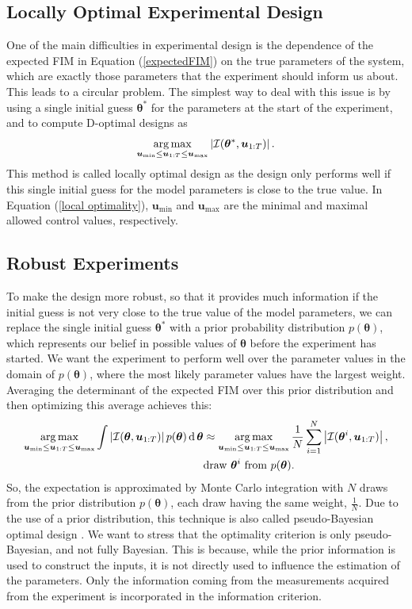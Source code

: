 \subsection{Locally Optimal Experimental Design}
One of the main difficulties in experimental design is the dependence of the expected FIM in Equation (\ref{expectedFIM}) on the true parameters of the system, which are exactly those parameters that the experiment should inform us about. This leads to a circular problem. The simplest way to deal with this issue is by using a single initial guess $\bm \theta^*$ for the parameters at the start of the experiment, and to compute D-optimal designs as
\begin{equation}
\operatorname*{arg\,max}_{\bm u_\text{min} \leq \bm u_{1:T} \leq \bm u_\text{max}}  \left | \mathcal{I}(\bm \theta^*,\bm u_{1:T}) \right|.
\label{local optimality}
\end{equation}
This method is called locally optimal design as the design only performs well if this single initial guess for the model parameters is close to the true value. In Equation (\ref{local optimality}), $\bm u_\text{min}$ and $\bm u_\text{max}$ are the minimal and maximal allowed control values, respectively.
\subsection{Robust Experiments}
To make the design more robust, so that it provides much information if the initial guess is not very close to the true value of the model parameters, we can replace the single initial guess $\bm \theta^*$ with a prior probability distribution $p(\bm \theta)$, which represents our belief in possible values of $\bm \theta$ before the experiment has started. We want the experiment to perform well over the parameter values in the domain of $p(\bm \theta)$, where the most likely parameter values have the largest weight. Averaging the determinant of the expected FIM over this prior distribution and then optimizing this average achieves this:
\begin{equation}
\begin{aligned}
\operatorname*{arg\,max}_{\bm u_\text{min} \leq \bm u_{1:T} \leq \bm u_\text{max}} \int \left | \mathcal{I}(\bm \theta,\bm u_{1:T}) \right | p(\bm \theta) \operatorname{\mathrm{d}} \bm \theta
&\approx \operatorname*{arg\,max}_{\bm u_\text{min} \leq \bm u_{1:T} \leq \bm u_\text{max}} \frac{1}{N} \sum_{i=1}^N
\left | \mathcal{I}(\bm \theta^i,\bm u_{1:T}) \right |,\\
&\text{draw } \bm \theta^i \text{ from } p(\bm \theta).
\label{bayesian optimality}
\end{aligned}
\end{equation}
So, the expectation is approximated by Monte Carlo integration with $N$ draws from the prior distribution $p(\bm \theta)$, each draw having the same weight, $\frac{1}{N}$. Due to the use of a prior distribution, this technique is also called pseudo-Bayesian optimal design \parencite{chaloner}. We want to stress that the optimality criterion is only pseudo-Bayesian, and not fully Bayesian. This is because, while the prior information is used to construct the inputs, it is not directly used to influence the estimation of the parameters. Only the information coming from the measurements acquired from the experiment is incorporated in the information criterion.
